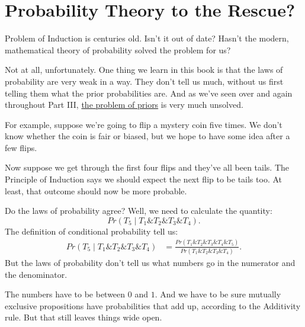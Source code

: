 \documentclass[justified]{tufte-book}
\newcommand{\given}{\mid}
\renewcommand{\wedge}{\mathbin{\&}}
\newcommand{\p}{Pr}
\begin{document}
\hypertarget{probability-theory-to-the-rescue}{%
\section*{Probability Theory to the Rescue?}\label{probability-theory-to-the-rescue}}

 Problem of Induction is centuries old. Isn't it out of date? Hasn't the modern, mathematical theory of probability solved the problem for us?

Not at all, unfortunately. One thing we learn in this book is that the laws of probability are very weak in a way. They don't tell us much, without us first telling them what the prior probabilities are. And as we've seen over and again throughout Part III, \protect\hyperlink{priors}{the problem of priors} is very much unsolved.

For example, suppose we're going to flip a mystery coin five times. We don't know whether the coin is fair or biased, but we hope to have some idea after a few flips.

Now suppose we get through the first four flips and they've all been tails. The Principle of Induction says we should expect the next flip to be tails too. At least, that outcome should now be more probable.

Do the laws of probability agree? Well, we need to calculate the quantity:
\[ \p(T_5 \given T_1 \wedge T_2 \wedge T_3 \wedge T_4).\]
The definition of conditional probability tell us:
\[
  \begin{aligned}
    \p(T_5 \given T_1 \wedge T_2 \wedge T_3 \wedge T_4) 
      &= \frac{\p(T_1 \wedge T_2 \wedge T_3 \wedge T_4 \wedge T_5)}
              {\p(T_1 \wedge T_2 \wedge T_3 \wedge T_4)}.
  \end{aligned}
\]
But the laws of probability don't tell us what numbers go in the numerator and the denominator.

The numbers have to be between \(0\) and \(1\). And we have to be sure mutually exclusive propositions have probabilities that add up, according to the Additivity rule. But that still leaves things wide open.
\end{document}
